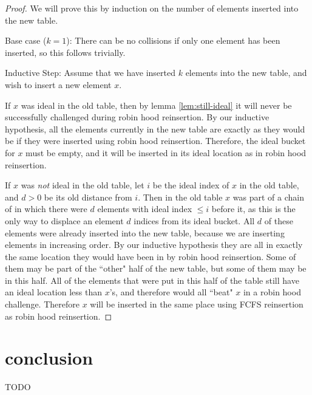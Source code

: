 \documentclass{cccg13}
\begin{document}
\begin{proof}
  We will prove this by induction on the number of elements inserted into the
  new table.

  Base case ($k = 1$): There can be no collisions if only one element has been
  inserted, so this follows trivially.

  Inductive Step: Assume that we have inserted $k$ elements into the new
  table, and wish to insert a new element $x$.

  If $x$ was ideal in the old table, then by lemma \ref{lem:still-ideal} it
  will never be successfully challenged during robin hood reinsertion. By our
  inductive hypothesis, all the elements currently in the new table are
  exactly as they would be if they were inserted using robin hood reinsertion.
  Therefore, the ideal bucket for $x$ must be empty, and it will be inserted
  in its ideal location as in robin hood reinsertion.

  If $x$ was \emph{not} ideal in the old table, let $i$ be the ideal index of
  $x$ in the old table, and $d > 0$ be its old distance from $i$. Then in the
  old table $x$ was part of a chain of in which there were $d$ elements with
  ideal index $\leq i$ before it, as this is the only way to displace an
  element $d$ indices from its ideal bucket. All $d$ of these elements were
  already inserted into the new table, because we are inserting elements in
  increasing order. By our inductive hypothesis they are all in exactly the
  same location they would have been in by robin hood reinsertion. Some of
  them may be part of the ``other" half of the new table, but some of them may
  be in this half. All of the elements that were put in this half of the table
  still have an ideal location less than $x$'s, and therefore would all
  ``beat" $x$ in a robin hood challenge. Therefore $x$ will be inserted in the
  same place using FCFS reinsertion as robin hood reinsertion.
\end{proof}

\section{conclusion}

TODO

\small


\end{document}

